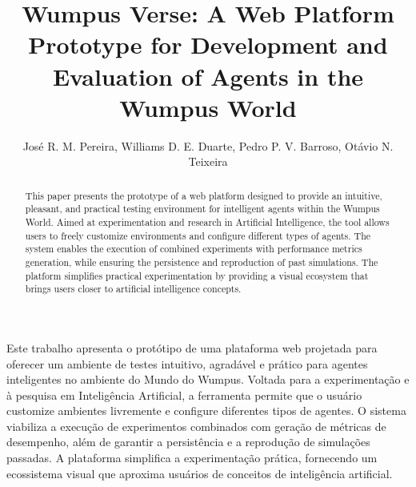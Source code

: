 \documentclass[12pt]{article}
\title{Wumpus Verse: A Web Platform Prototype for Development and Evaluation of Agents in the Wumpus World}
\author{José R. M. Pereira\inst{1}, Williams D. E. Duarte\inst{2}, Pedro P. V. Barroso\inst{1}, Otávio N. Teixeira\inst{1,2}}
\begin{document}
 

\maketitle

\begin{abstract}
  This paper presents the prototype of a web platform designed to provide an intuitive, pleasant, and practical testing environment for intelligent agents within the Wumpus World. Aimed at experimentation and research in Artificial Intelligence, the tool allows users to freely customize environments and configure different types of agents. The system enables the execution of combined experiments with performance metrics generation, while ensuring the persistence and reproduction of past simulations. The platform simplifies practical experimentation by providing a visual ecosystem that brings users closer to artificial intelligence concepts.
\end{abstract}
     
\begin{resumo} 
  Este trabalho apresenta o protótipo de uma plataforma web projetada para oferecer um ambiente de testes intuitivo, agradável e prático para agentes inteligentes no ambiente do Mundo do Wumpus. Voltada para a experimentação e à pesquisa em Inteligência Artificial, a ferramenta permite que o usuário customize ambientes livremente e configure diferentes tipos de agentes. O sistema viabiliza a execução de experimentos combinados com geração de métricas de desempenho, além de garantir a persistência e a reprodução de simulações passadas. A plataforma simplifica a experimentação prática, fornecendo um ecossistema visual que aproxima usuários de conceitos de inteligência artificial.
\end{resumo}













\end{document}
